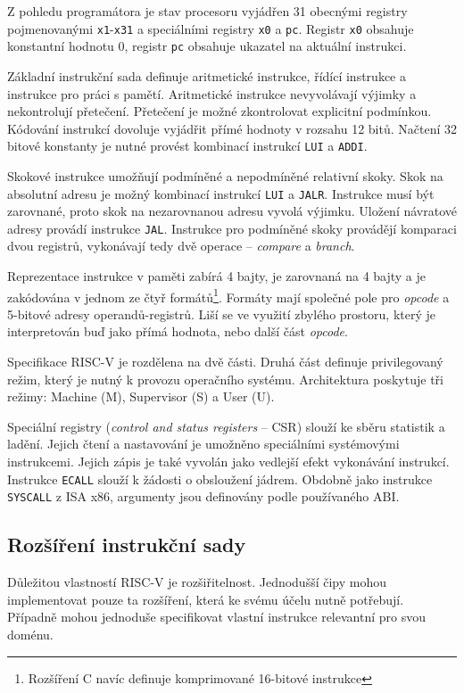 Z pohledu programátora je stav procesoru vyjádřen 31 obecnými registry pojmenovanými \texttt{x1}-\texttt{x31} a speciálními registry \texttt{x0} a \texttt{pc}.
Registr \texttt{x0} obsahuje konstantní hodnotu 0, registr \texttt{pc} obsahuje ukazatel na aktuální instrukci.

Základní instrukční sada definuje aritmetické instrukce, řídící instrukce a instrukce pro práci s pamětí.
Aritmetické instrukce nevyvolávají výjimky a nekontrolují přetečení.
Přetečení je možné zkontrolovat explicitní podmínkou.
Kódování instrukcí dovoluje vyjádřit přímé hodnoty v rozsahu 12 bitů.
Načtení 32 bitové konstanty je nutné provést kombinací instrukcí \texttt{LUI} a \texttt{ADDI}.

Skokové instrukce umožňují podmíněné a nepodmíněné relativní skoky.
Skok na absolutní adresu je možný kombinací instrukcí \texttt{LUI} a \texttt{JALR}.
Instrukce musí být zarovnané, proto skok na nezarovnanou adresu vyvolá výjimku.
Uložení návratové adresy provádí instrukce \texttt{JAL}.
Instrukce pro podmíněné skoky provádějí komparaci dvou registrů, vykonávají tedy dvě operace -- \emph{compare} a \emph{branch}.

Reprezentace instrukce v paměti zabírá 4 bajty, je zarovnaná na 4 bajty a je zakódována v jednom ze čtyř formátů\footnote{Rozšíření C navíc definuje komprimované 16-bitové instrukce}.
Formáty mají společné pole pro \emph{opcode} a 5-bitové adresy operandů-registrů.
Liší se ve využití zbylého prostoru, který je interpretován buď jako přímá hodnota, nebo další část \emph{opcode}.

Specifikace RISC-V je rozdělena na dvě části.
Druhá část definuje privilegovaný režim, který je nutný k provozu operačního systému.
Architektura poskytuje tři režimy: Machine (M), Supervisor (S) a User (U).

Speciální registry (\emph{control and status registers} -- CSR) slouží ke sběru statistik a ladění.
Jejich čtení a nastavování je umožněno speciálními systémovými instrukcemi.
Jejich zápis je také vyvolán jako vedlejší efekt vykonávání instrukcí.
Instrukce \texttt{ECALL} slouží k žádosti o obsloužení jádrem.
Obdobně jako instrukce \texttt{SYSCALL} z ISA x86, argumenty jsou definovány podle používaného ABI.

\subsection{Rozšíření instrukční sady}
Důležitou vlastností RISC-V je rozšiřitelnost.
Jednodušší čipy mohou implementovat pouze ta rozšíření, která ke svému účelu nutně potřebují.
Případně mohou jednoduše specifikovat vlastní instrukce relevantní pro svou doménu.

